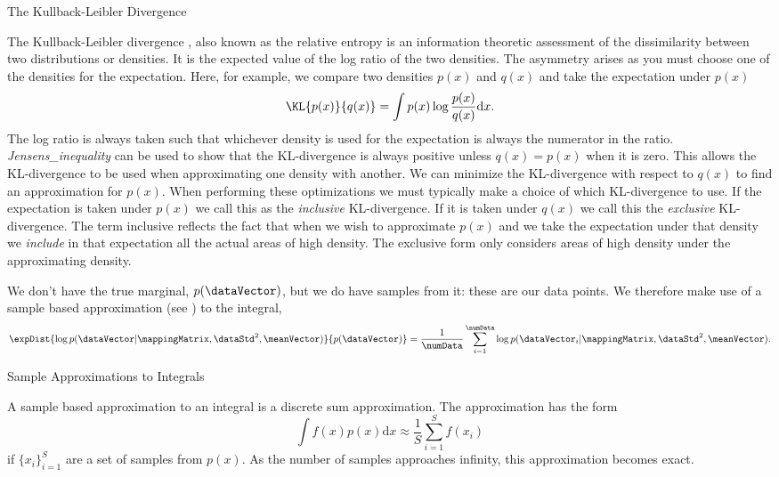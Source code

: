 \begin{boxfloat}
  \caption{The Kullback-Leibler Divergence}\label{box:kldivergence}
  
  \boxfontsize The Kullback-Leibler divergence \cite{Kullback:info51}, also known as the
  relative entropy  is an information theoretic
  assessment of the dissimilarity between two distributions or
  densities. It is the expected value of the log ratio of the two
  densities. The asymmetry arises as you must choose one of the
  densities for the expectation. Here, for example, we compare two
  densities $p(x)$ and $q(x)$ and take the expectation under $p(x)$
  \[
  \KL{p(x)}{q(x)} = \int p(x) \log \frac{p(x)}{q(x)} \text{d}x.
  \]
  The log ratio is always taken such that whichever density is used
  for the expectation is always the numerator in the ratio. \emph{\gls{Jensens_inequality}}
  can be used to show that the KL-divergence is always
  positive unless $q(x)=p(x)$ when it is zero. This allows the
  KL-divergence to be used when approximating one density with
  another. We can minimize the KL-divergence with respect to $q(x)$ to
  find an approximation for $p(x)$. When performing these
  optimizations we must typically make a choice of which KL-divergence
  to use. If the expectation is taken under $p(x)$ we call this as the
  \emph{inclusive} KL-divergence. If it is taken under $q(x)$ we call
  this the \emph{exclusive} KL-divergence. The term inclusive reflects
  the fact that when we wish to approximate $p(x)$ and we take the
  expectation under that density we \emph{include} in that expectation
  all the actual areas of high density. The exclusive form only
  considers areas of high density under the approximating density. 
\end{boxfloat}

We don't have the true marginal, $p(\dataVector)$, but we do have
samples from it: these are our data points. We therefore make use of a
sample based approximation (see ) to the integral,
\[
\expDist{\log
  p(\dataVector| \mappingMatrix, \dataStd^2,
  \meanVector)}{p(\dataVector)} = \frac{1}{\numData}\sum_{i=1}^\numData\log
p(\dataVector_i| \mappingMatrix, \dataStd^2,
\meanVector).
\]

\begin{boxfloat}
  \caption{Sample Approximations to Integrals}\label{box:sample}

  \boxfontsize A sample based approximation to an integral is a discrete sum approximation. The approximation has the form
  \[
  \int f(x) p(x) \text{d}x \approx \frac{1}{S} \sum_{i=1}^Sf(x_i)
  \]
  if $\{x_i\}_{i=1}^S$ are a set of samples from $p(x)$. As the number of samples approaches infinity, this approximation becomes exact.  
\end{boxfloat}

